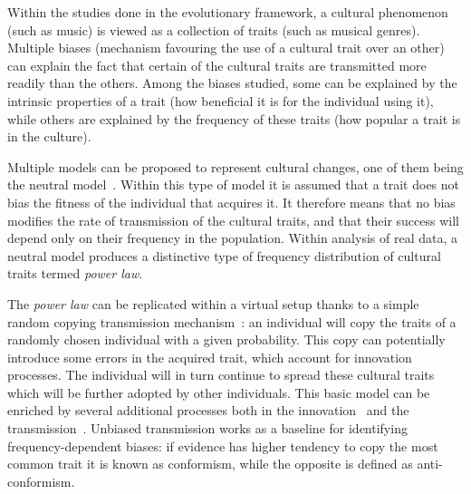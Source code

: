 \documentclass{wscpaperproc}
\begin{document}
Within the studies done in the evolutionary framework, a cultural phenomenon (such as music) is viewed as a collection of traits (such as musical genres). Multiple biases (mechanism favouring the use of a cultural trait over an other) can explain the fact that certain of the cultural traits are transmitted more readily than the others. Among the biases studied, some can be explained by the intrinsic properties of a trait (how beneficial it is for the individual using it), while others are explained by the frequency of these traits (how popular a trait is in the culture). 

Multiple models can be proposed to represent cultural changes, one of them being the neutral model~\cite{neiman_stylistic_1995}. Within this type of model it is assumed that a trait does not bias the fitness of the individual that acquires it. It therefore means that no bias modifies the rate of transmission of the cultural traits, and that their success will depend only on their frequency in the population. Within analysis of real data, a neutral model produces a distinctive type of frequency distribution of cultural traits termed \emph{power law}.
 
The \emph{power law} can be replicated within a virtual setup thanks to a simple random copying transmission mechanism~\cite{bentley_random_2004}: an individual will copy the traits of a randomly chosen individual with a given probability. This copy can potentially introduce some errors in the acquired trait, which account for innovation processes. The individual will in turn continue to spread these cultural traits which will be further adopted by other individuals. This basic model can be enriched by several additional processes both in the innovation~ and the transmission~\cite{heyes_social_1994,henrich_evolution_2003}. Unbiased transmission works as a baseline for identifying frequency-dependent biases: if evidence has higher tendency to copy the most common trait it is known as conformism, while the opposite is defined as anti-conformism.
\end{document}
